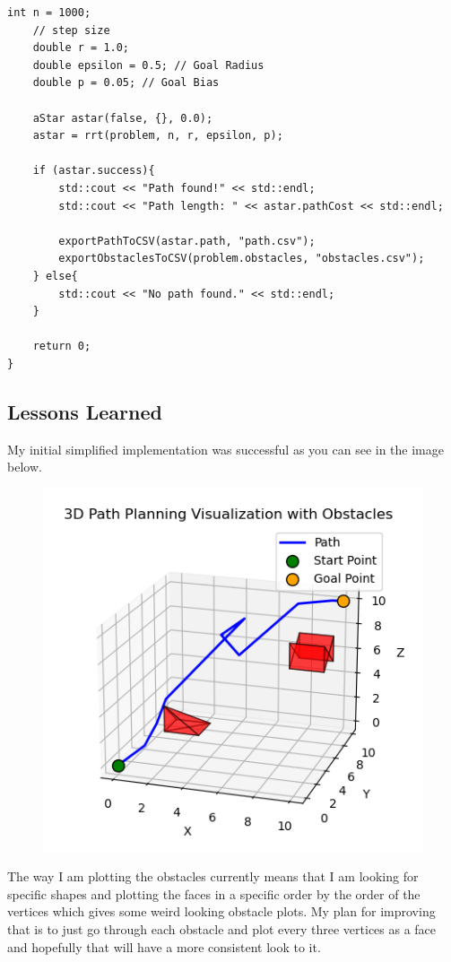 \documentclass{article}
\begin{document}
\begin{lstlisting}[style=cppstyle]
    int n = 1000;
    // step size
    double r = 1.0;
    double epsilon = 0.5; // Goal Radius
    double p = 0.05; // Goal Bias

    aStar astar(false, {}, 0.0);
    astar = rrt(problem, n, r, epsilon, p);

    if (astar.success){
        std::cout << "Path found!" << std::endl;
        std::cout << "Path length: " << astar.pathCost << std::endl;

        exportPathToCSV(astar.path, "path.csv");
        exportObstaclesToCSV(problem.obstacles, "obstacles.csv");
    } else{
        std::cout << "No path found." << std::endl;
    }

    return 0;
}
\end{lstlisting}

\subsection*{Lessons Learned}

My initial simplified implementation was successful as you can see in the image below.

\begin{figure}[H]
    \centering
    \includegraphics[width=0.7\linewidth]{3DrrtPlot.png}
\end{figure}

The way I am plotting the obstacles currently means that I am looking for specific shapes and plotting the faces in a specific order by the order of the vertices which gives some weird looking obstacle plots.
My plan for improving that is to just go through each obstacle and plot every three vertices as a face and hopefully that will have a more consistent look to it.
\end{document}

